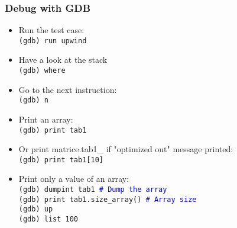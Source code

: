 \documentclass[10pt, hyperref={unicode=true,pdfusetitle, bookmarks=true,bookmarksnumbered=false,bookmarksopen=false, breaklinks=false,pdfborder={0 0 1},backref=true,colorlinks=true,linkcolor=darkblue,pageanchor, urlcolor=darkblue}]{beamer}
\begin{document}
\begin{frame}
\frametitle{Debug with GDB}
\begin{block}{}

\begin{itemize}
\item Run the test case:\\
\texttt{(gdb) run upwind}
\item Have a look at the stack\\
\texttt{(gdb) where}

\item Go to the next instruction:\\
\texttt{(gdb) n}

\item Print an array:\\
\texttt{(gdb) print tab1}

\item Or print matrice.tab1\_ if "optimized out" message printed:\\
\texttt{(gdb) print tab1[10]}

\item Print only a value of an array:\\
\texttt{(gdb) dumpint tab1 \textcolor{blue}{\# Dump the array}} \\
\texttt{(gdb) print tab1.size\_array() \textcolor{blue}{\# Array size}}\\
\texttt{(gdb) up}\\
\texttt{(gdb) list 100}
\end{itemize}

\end{block}
\end{frame}
\end{document}
